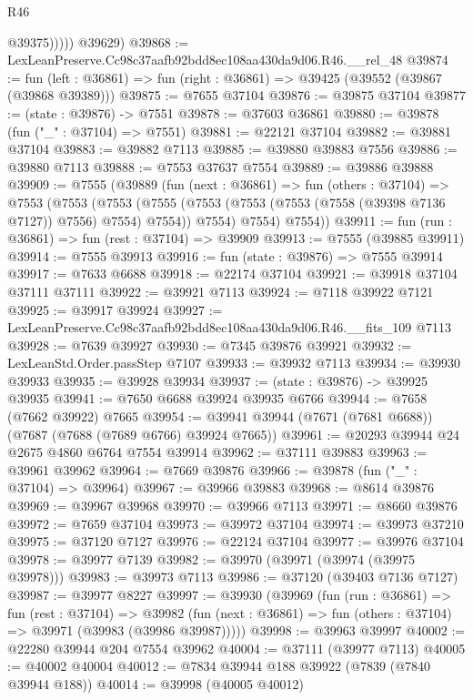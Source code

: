 \begin{lexlean}{R46}
\begin{coremodule}
                @39375)))))
      @39629)
@39868 := LexLeanPreserve.Cc98c37aafb92bdd8ec108aa430da9d06.R46.__rel_48
@39874 := fun (left : @36861) => fun (right : @36861) => @39425 (@39552 (@39867 (@39868 @39389)))
@39875 := @7655 @37104
@39876 := @39875 @37104
@39877 := (state : @39876) -> @7551
@39878 := @37603 @36861
@39880 := @39878 (fun ("_" : @37104) => @7551)
@39881 := @22121 @37104
@39882 := @39881 @37104
@39883 := @39882 @7113
@39885 := @39880 @39883 @7556
@39886 := @39880 @7113
@39888 := @7553 @37637 @7554
@39889 := @39886 @39888
@39909 := @7555
    (@39889
      (fun (next : @36861) =>
      fun (others : @37104) =>
      @7553
        (@7553
          (@7553
            (@7555 (@7553 (@7553 (@7553 (@7558 (@39398 @7136 @7127)) @7556) @7554) @7554))
            @7554)
          @7554)
        @7554))
@39911 := fun (run : @36861) => fun (rest : @37104) => @39909
@39913 := @7555 (@39885 @39911)
@39914 := @7555 @39913
@39916 := fun (state : @39876) => @7555 @39914
@39917 := @7633 @6688
@39918 := @22174 @37104
@39921 := @39918 @37104 @37111 @37111
@39922 := @39921 @7113
@39924 := @7118 @39922 @7121
@39925 := @39917 @39924
@39927 := LexLeanPreserve.Cc98c37aafb92bdd8ec108aa430da9d06.R46.__fits_109 @7113
@39928 := @7639 @39927
@39930 := @7345 @39876 @39921
@39932 := LexLeanStd.Order.passStep @7107
@39933 := @39932 @7113
@39934 := @39930 @39933
@39935 := @39928 @39934
@39937 := (state : @39876) -> @39925 @39935
@39941 := @7650 @6688 @39924 @39935 @6766
@39944 := @7658 (@7662 @39922) @7665
@39954 := @39941 @39944 (@7671 (@7681 @6688)) (@7687 (@7688 (@7689 @6766) @39924 @7665))
@39961 := @20293 @39944 @24 @2675 @4860 @6764 @7554 @39914
@39962 := @37111 @39883
@39963 := @39961 @39962
@39964 := @7669 @39876
@39966 := @39878 (fun ("_" : @37104) => @39964)
@39967 := @39966 @39883
@39968 := @8614 @39876
@39969 := @39967 @39968
@39970 := @39966 @7113
@39971 := @8660 @39876
@39972 := @7659 @37104
@39973 := @39972 @37104
@39974 := @39973 @37210
@39975 := @37120 @7127
@39976 := @22124 @37104
@39977 := @39976 @37104
@39978 := @39977 @7139
@39982 := @39970 (@39971 (@39974 (@39975 @39978)))
@39983 := @39973 @7113
@39986 := @37120 (@39403 @7136 @7127)
@39987 := @39977 @8227
@39997 := @39930
    (@39969
      (fun (run : @36861) =>
      fun (rest : @37104) =>
      @39982 (fun (next : @36861) => fun (others : @37104) => @39971 (@39983 (@39986 @39987)))))
@39998 := @39963 @39997
@40002 := @22280 @39944 @204 @7554 @39962
@40004 := @37111 (@39977 @7113)
@40005 := @40002 @40004
@40012 := @7834 @39944 @188 @39922 (@7839 (@7840 @39944 @188))
@40014 := @39998 (@40005 @40012)

\end{coremodule}
\end{lexlean}
